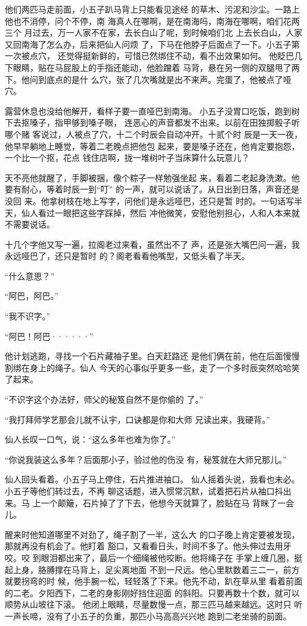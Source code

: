 他们两匹马走前面，小五子趴马背上只能看见途经
的草木、污泥和沙尘。一路上他也不消停，问个不停，南
海真人在哪啊，是在南海吗，南海在哪啊，咱们花两三个
月过去，万一人家不在家，去长白山了呢，到时候咱们北
上去长白山，人家又回南海了怎么办，后来把仙人问烦
了，下马在他脖子后面点了一下。小五子第一次被点穴，
还觉得挺新鲜的，可惜已然绑住不动，看不出效果如何。
他眨巴几下眼睛，贴在马屁股上的手指还能动，他脸蹭着
马背，悬在另一侧的双腿甩了两下。他问到底点的是什
么穴，张了几次嘴就是出不来声。完蛋了，他被点了哑
穴。

露营休息也没给他解开，看样子要一直哑巴到南海。
小五子没胃口吃饭，跑到树下去抠嗓子，指甲够到嗓子眼，
连恶心的声音都发不出来。以前在田独掷骰子听哪个赌
客说过，人被点了穴，十二个时辰会自动冲开。十贰个时
辰是一天一夜，他早早躺地上睡觉，等着二老晚点把他包
起来，要是嗓子还在，他肯定要抱怨，一个比一个抠，花点
钱住店啊，拢一堆树叶子当床算什么玩意儿？

天不亮他就醒了，手脚被捆，像个粽子一样勉强坐起
来，看着二老起身洗漱。他要有耐心，等着时辰一到“叮”
的一声，就可以说话了。从日出到日落，声音还是没回
来。他拿树枝在地上写字，问他们是永远哑巴，还只是暂
时的。一句话写半天，仙人看过一眼把这些字踩掉，然后
冲他微笑，安慰他别担心，人和人本来就不需要说话。

十几个字他又写一遍，拉阁老过来看，虽然出不了
声，还是张大嘴巴问一遍，我永远哑巴了，还只是暂时
的？阁老看看他嘴型，又低头看了半天。

“什么意思？”

“阿巴，阿巴。”

“我不识字。”

“阿巴！阿巴······”

他计划逃跑，寻找一个石片藏袖子里。白天赶路还
是他们俩在前，他在后面慢慢割绑在身上的绳子。仙人
今天的心事似乎更多一些，走了一个多时辰突然哈哈笑
了起来。

“不识字这个办法好，师父的秘笈自然不是你偷的
了。”

“我打拜师学艺那会儿就不认宇，口诀都是你和大师
兄读出来，我硬背。”

仙人长叹一口气，说：“这么多年也难为你了。”

“你说我装这么多年？后面那小子，验过他的伤没
有，秘笈就在大师兄那儿。”

仙人回头看着。小五子马上停住，石片推进袖口。
仙人摇着头说，我看也未必。小五子等他们转过去，不再
聊这话题，进入惯常沉默，试着把石片从袖口抖出来。马
上一个颠簸，石片掉了了下去，他想今天就算了，脸贴在马
背眯了一会儿。

醒来时他知道哪里不对劲了，绳子割了一半，这么大
的口子晚上肯定要被发现，那就再没有机会了。他盯着
豁口，又看看日头，时间不多了。他头伸过去用牙咬。咬
到眼泪都出来了，最后一个细绳被他咬断。他将绳子在
手掌上缠几圈，挺起上身，胳膊撑在马背上，足尖离地面
不到一尺远。他心里默数着三二一，前方就要拐弯的时
候，他手腕一松，轻轻落了下来。他先不动，趴在草从里
看着前面的二老。夕阳西下，二老的身影刚好挡住迎面
的斜阳。只要再数十个数，就可以顺势从山坡往下滚。
他闭上眼睛，尽量数慢一点，那三匹马越来越远。这时只
听一声长啼，没有了小五子的负重，那匹小马高高兴兴地
跑到二老坐骑的前面。


